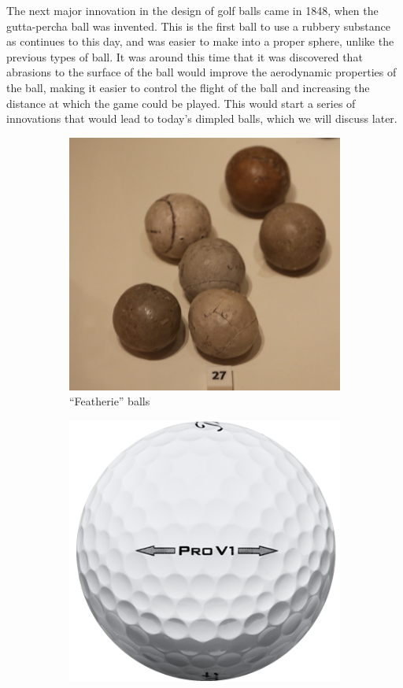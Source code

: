 The next major innovation in the design of golf balls came in 1848, when the gutta-percha
ball was invented. This is the first ball to use a rubbery substance as continues to this day,
and was easier to make into a proper sphere, unlike the previous types of ball. It was around
this time that it was discovered that abrasions to the surface of the ball would improve the
aerodynamic properties of the ball, making it easier to control the flight of the ball and increasing
the distance at which the game could be played. This would start a series of innovations that
would lead to today’s dimpled balls, which we will discuss later.

\begin{figure}[h]
\centering
\begin{subfigure}[b]{0.4\textwidth}
\includegraphics[scale=0.16]{../images/featherie.jpg}
\caption{``Featherie'' balls}
\label{im:featherie}
\end{subfigure}
\quad \quad \quad \quad
\begin{subfigure}[b]{0.4\textwidth}
\includegraphics[scale=0.5]{../images/pv1.png}

\end{subfigure}
\end{figure}
